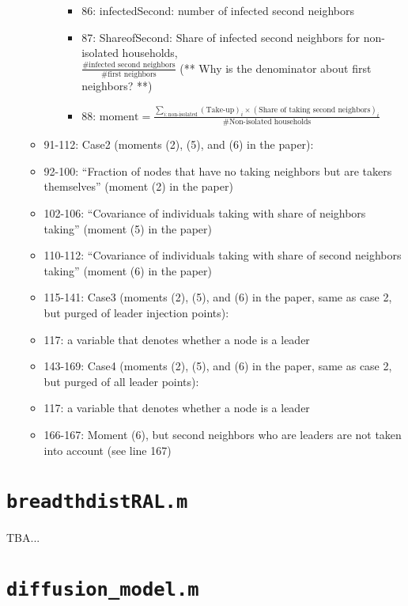 \documentclass[10pt,letterpaper]{article}
\begin{document}
\begin{itemize}
\begin{itemize}
\begin{itemize}
\begin{itemize}
              \item 86: infectedSecond: number of infected second neighbors
              \item 87: ShareofSecond: Share of infected second neighbors for non-isolated households, \\
                $\frac{\text{\# infected second neighbors}}{\text{\# first neighbors}}$ (** Why is the denominator about first neighbors? **)
              \item 88: $\text{moment} = \frac{\sum_{i: \text{non-isolated}} (\text{Take-up})_i \times (\text{Share of taking second neighbors})_i}{\text{\# Non-isolated households}}$
            \end{itemize}
        \end{itemize}
      \item 91-112: Case2 (moments (2), (5), and (6) in the paper):
          \item 92-100: ``Fraction of nodes that have no taking neighbors but are takers themselves'' (moment (2) in the paper)
          \item 102-106: ``Covariance of individuals taking with share of neighbors taking'' (moment (5) in the paper)
          \item 110-112: ``Covariance of individuals taking with share of second neighbors taking'' (moment (6) in the paper)
      \item 115-141: Case3 (moments (2), (5), and (6) in the paper, same as case 2, but purged of leader injection points):
          \item 117: a variable that denotes whether a node is a leader
      \item 143-169: Case4 (moments (2), (5), and (6) in the paper, same as case 2, but purged of all leader points):
          \item 117: a variable that denotes whether a node is a leader
          \item 166-167: Moment (6), but second neighbors who are leaders are not taken into account (see line 167)
    \end{itemize}
\end{itemize}

\section{\texttt{breadthdistRAL.m}}\label{breadthdistRAL}
TBA...

\section{\texttt{diffusion\_model.m}}\label{diffusion_model}

\clearpage
%
%
\end{document}
